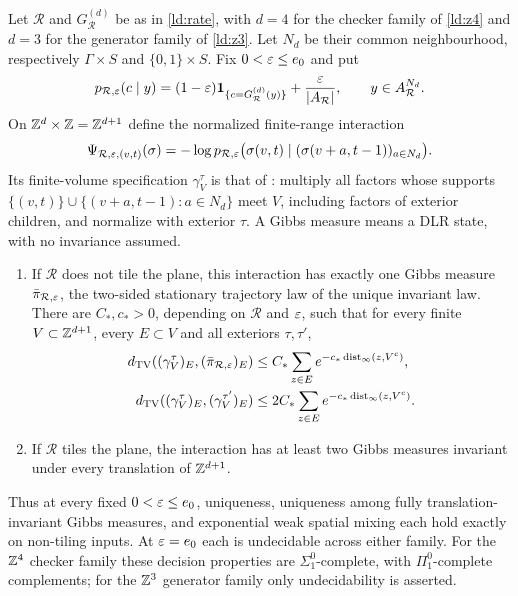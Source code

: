\begin{corollary}\label{ld:gibbs}
Let $\mathcal R$ and $G_{\mathcal R}^{(d)}$ be as in \cref{ld:rate}, with $d=4$ for the checker family of \cref{ld:z4} and $d=3$ for the generator family of \cref{ld:z3}. Let $N_d$ be their common neighbourhood, respectively $\Gamma\times S$ and $\{0,1\}\times S$. Fix $0<\varepsilon\le e_0$ and put
\[
 p_{\mathcal R,\varepsilon}(c\mid y)
 =(1-\varepsilon)\mathbf1_{\{c=G_{\mathcal R}^{(d)}(y)\}}
       +\frac{\varepsilon}{|A_{\mathcal R}|},\qquad
 y\in A_{\mathcal R}^{N_d}.
\]
On $\mathbb{Z}^d\times\mathbb{Z}=\mathbb{Z}^{d+1}$ define the normalized finite-range interaction
\[
 \Psi_{\mathcal R,\varepsilon,(v,t)}(\sigma)
 =-\log p_{\mathcal R,\varepsilon}\bigl(\sigma(v,t)\mid
                     (\sigma(v+a,t-1))_{a\in N_d}\bigr).
\]
Its finite-volume specification $\gamma_V^\tau$ is that of \cite[equation~(6)]{DM26}: multiply all factors whose supports
$\{(v,t)\}\cup\{(v+a,t-1):a\in N_d\}$ meet $V$, including factors of exterior children, and normalize with exterior $\tau$. A Gibbs measure means a DLR state, with no invariance assumed.
\begin{enumerate}[label=(\roman*)]
\item If $\mathcal R$ does not tile the plane, this interaction has exactly one Gibbs measure $\bar\pi_{\mathcal R,\varepsilon}$, the two-sided stationary trajectory law of the unique invariant law. There are $C_*,c_*>0$, depending on $\mathcal R$ and $\varepsilon$, such that for every finite $V\subset\mathbb{Z}^{d+1}$, every $E\subset V$ and all exteriors $\tau,\tau'$,
\begin{align*}
 d_{\mathrm{TV}}((\gamma_V^\tau)_E,(\bar\pi_{\mathcal R,\varepsilon})_E)
 &\le C_*\sum_{z\in E}e^{-c_*\operatorname{dist}_\infty(z,V^c)},\\
 d_{\mathrm{TV}}((\gamma_V^\tau)_E,(\gamma_V^{\tau'})_E)
 &\le2C_*\sum_{z\in E}e^{-c_*\operatorname{dist}_\infty(z,V^c)}.
\end{align*}
\item If $\mathcal R$ tiles the plane, the interaction has at least two Gibbs measures invariant under every translation of $\mathbb{Z}^{d+1}$.
\end{enumerate}
Thus at every fixed $0<\varepsilon\le e_0$, uniqueness, uniqueness among fully translation-invariant Gibbs measures, and exponential weak spatial mixing each hold exactly on non-tiling inputs. At $\varepsilon=e_0$ each is undecidable across either family. For the $\mathbb{Z}^4$ checker family these decision properties are $\Sigma^0_1$-complete, with $\Pi^0_1$-complete complements; for the $\mathbb{Z}^3$ generator family only undecidability is asserted.
\end{corollary}
